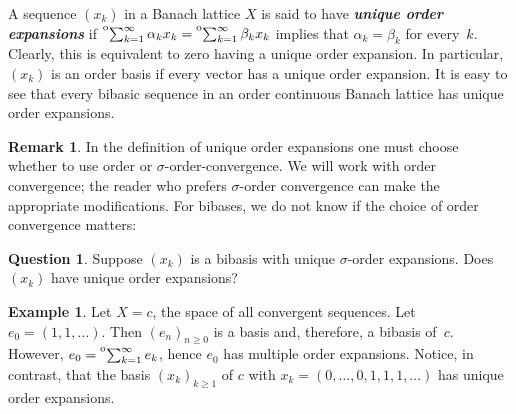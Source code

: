 \documentclass[12pt]{amsart}
\theoremstyle{plain}
\theoremstyle{definition}
\newtheorem{remark}[theorem]{Remark}
\newtheorem{question}[theorem]{Question}
\newtheorem{example}[theorem]{Example}
\newcommand{\term}[1]{{\textit{\textbf{#1}}}}   %
\newcommand{\tos}{\prescript{{\rm o}}{}{\sum_{k=1}^\infty\,}}
\renewcommand{\ge}{\geqslant}
\begin{document}
A sequence $(x_k)$ in a Banach lattice $X$ is said to have
\term{unique order expansions} if $\tos\alpha_kx_k=\tos\beta_kx_k$
implies that $\alpha_k=\beta_k$ for every~$k$. Clearly, this is
equivalent to zero having a unique order expansion. In particular,
$(x_k)$ is an order basis if every vector has a unique order
expansion. It is easy to see that every bibasic sequence in an order
continuous Banach lattice has unique order expansions.

\begin{remark}\label{sigma-sester}
  In the definition of unique order expansions one must choose whether
  to use order or $\sigma$-order-convergence. We will work with
  order convergence; the reader who prefers $\sigma$-order convergence can
  make the appropriate modifications. For bibases, we do not know if
  the choice of order convergence matters:
\end{remark}


\begin{question}
  Suppose $(x_k)$ is a bibasis with unique $\sigma$-order
  expansions. Does $(x_k)$ have unique order expansions?
\end{question}

\begin{example}\label{nonuniq linfty}
  Let $X=c$, the space of all convergent sequences. Let
  $e_0=(1,1,\dots)$. Then $(e_n)_{n\ge 0}$ is a basis and, therefore,
  a bibasis of~$c$. However, $e_0=\tos e_k$, hence $e_0$ has multiple
  order expansions. Notice, in contrast, that the basis
  $(x_k)_{k\ge 1}$ of $c$ with
\begin{math}
      x_k=(0,\dots,0,1,1,1,\dots)
  \end{math}
  has unique
  order expansions.
\end{example}
\end{document}
